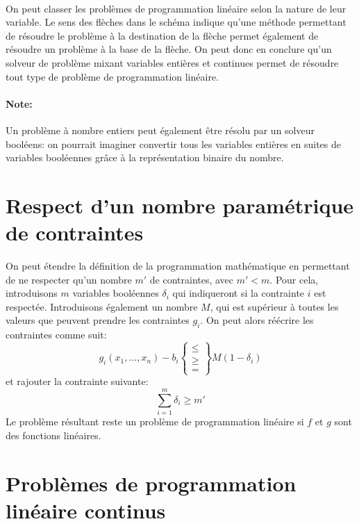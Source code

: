 \documentclass[a4paper]{report}
\begin{document}
\paragraph{}On peut classer les problèmes de programmation linéaire selon la
nature de leur variable. Le sens des flèches dans le schéma indique qu'une
méthode permettant de résoudre le problème à la destination de la flèche permet
également de résoudre un problème à la base de la flèche. On peut donc en
conclure qu'un solveur de problème mixant variables entières et continues permet
de résoudre tout type de problème de programmation linéaire.
\paragraph{Note:}Un problème à nombre entiers peut également être résolu par un
solveur booléens: on pourrait imaginer convertir tous les variables entières en
suites de variables booléennes grâce à la représentation binaire du nombre.

\section{Respect d'un nombre paramétrique de contraintes}
On peut étendre la définition de la programmation mathématique en permettant
de ne respecter qu'un nombre \(m'\) de contraintes, avec \(m'<m\).
Pour cela, introduisons \(m\) variables booléennes \(\delta_i\) qui indiqueront
si la contrainte \(i\) est respectée. Introduisons également un nombre \(M\),
qui est supérieur à toutes les valeurs que peuvent prendre les contraintes
\(g_i\). On peut alors réécrire les contraintes
comme suit:
\[g_i(x_1,\dots,x_n)-b_i\begin{Bmatrix}\le\\\ge\\=\end{Bmatrix}M(1-\delta_i)\]
et rajouter la contrainte suivante:
\[\sum_{i=1}^{m}\delta_i\ge m'\]
Le problème résultant reste un problème de programmation linéaire si \(f\) et
\(g\) sont des fonctions linéaires.

\section{Problèmes  de programmation linéaire continus}
\end{document}
